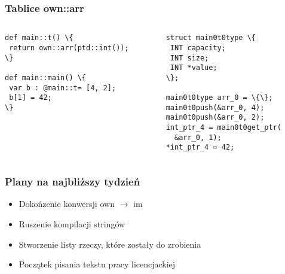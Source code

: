 \documentclass{beamer}
\begin{document}
	\begin{frame}[fragile]
		\frametitle{Tablice own::arr}
		\begin{columns}
			\begin{column}{0.5\textwidth}
				\begin{Verbatim}[commandchars=\\\{\}]
def main::t() \{
 return own::arr(ptd::int());
\}

def main::main() \{
 var b : @main::t= [4, 2];
 b[1] = 42;
\}
				\end{Verbatim}
			\end{column}
			\begin{column}{0.5\textwidth}  %
				\begin{Verbatim}[commandchars=\\\{\}]
struct main0t0type \{
 INT capacity;
 INT size;
 INT *value;
\};

main0t0type arr_0 = \{\};
main0t0push(&arr_0, 4);
main0t0push(&arr_0, 2);
int_ptr_4 = main0t0get_ptr(
  &arr_0, 1);
*int_ptr_4 = 42;
				\end{Verbatim}
			\end{column}
		\end{columns}
	\end{frame}
	
	\begin{frame}
		\frametitle{Plany na najbliższy tydzień}
		\begin{itemize}
			\item Dokońzenie konwersji own $\rightarrow$ im
			\item Ruszenie kompilacji stringów
			\item Stworzenie listy rzeczy, które zostały do zrobienia
			\item Początek pisania tekstu pracy licencjackiej
		\end{itemize}
	\end{frame}
\end{document}
